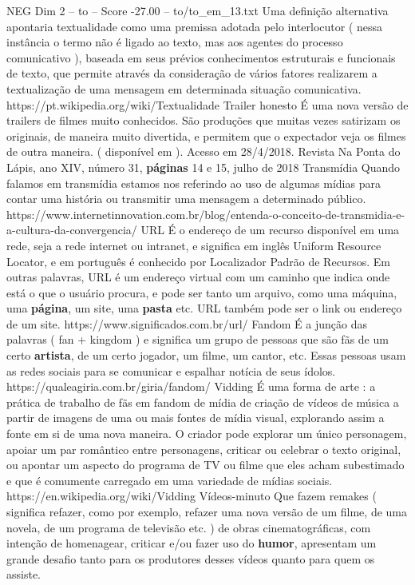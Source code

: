 \begin{textsample}{NEG Dim 2 – to – Score -27.00 – to/to\_em\_13.txt}
Uma definição alternativa apontaria textualidade como uma premissa adotada pelo interlocutor ( nessa instância o termo não é ligado ao texto, mas aos agentes do processo comunicativo ), baseada em seus prévios conhecimentos estruturais e funcionais de texto, que permite através da consideração de vários fatores realizarem a textualização de uma mensagem em determinada situação comunicativa. https://pt.wikipedia.org/wiki/Textualidade Trailer honesto É uma nova versão de trailers de filmes muito conhecidos.
São produções que muitas vezes satirizam os originais, de maneira muito divertida, e permitem que o expectador veja os filmes de outra maneira. ( disponível em ).
Acesso em 28/4/2018.
Revista Na Ponta do Lápis, ano XIV, número 31, \textbf{páginas} 14 e 15, julho de 2018 Transmídia Quando falamos em transmídia estamos nos referindo ao uso de algumas mídias para contar uma história ou transmitir uma mensagem a determinado público. https://www.internetinnovation.com.br/blog/entenda-o-conceito-de-transmidia-e-a-cultura-da-convergencia/ URL É o endereço de um recurso disponível em uma rede, seja a rede internet ou intranet, e significa em inglês Uniform Resource Locator, e em português é conhecido por Localizador Padrão de Recursos.
Em outras palavras, URL é um endereço virtual com um caminho que indica onde está o que o usuário procura, e pode ser tanto um arquivo, como uma máquina, uma \textbf{página}, um site, uma \textbf{pasta} etc.
URL também pode ser o link ou endereço de um site. https://www.significados.com.br/url/ Fandom É a junção das palavras ( fan + kingdom ) e significa um grupo de pessoas que são fãs de um certo \textbf{artista}, de um certo jogador, um filme, um cantor, etc.
Essas pessoas usam as redes sociais para se comunicar e espalhar notícia de seus ídolos. https://qualeagiria.com.br/giria/fandom/ Vidding É uma forma de arte : a prática de trabalho de fãs em fandom de mídia de criação de vídeos de música a partir de imagens de uma ou mais fontes de mídia visual, explorando assim a fonte em si de uma nova maneira.
O criador pode explorar um único personagem, apoiar um par romântico entre personagens, criticar ou celebrar o texto original, ou apontar um aspecto do programa de TV ou filme que eles acham subestimado e que é comumente carregado em uma variedade de mídias sociais. https://en.wikipedia.org/wiki/Vidding Vídeos-minuto Que fazem remakes ( significa refazer, como por exemplo, refazer uma nova versão de um filme, de uma novela, de um programa de televisão etc. ) de obras cinematográficas, com intenção de homenagear, criticar e/ou fazer uso do \textbf{humor}, apresentam um grande desafio tanto para os produtores desses vídeos quanto para quem os assiste.

\end{textsample}
